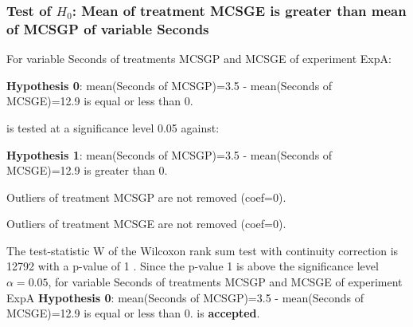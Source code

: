 \begin{frame}[t]
 \frametitle{Test of $H_{0}$: Mean of treatment MCSGE is greater than mean of MCSGP of variable Seconds }
 \scriptsize
 For variable Seconds of treatments MCSGP and MCSGE of experiment ExpA:

\vspace{1mm}
{\bf Hypothesis 0}: mean(Seconds of MCSGP)=3.5 - mean(Seconds of MCSGE)=12.9 is equal or less than 0.


 \begin{center} is tested at a significance level 0.05 against: \end{center}

{\bf Hypothesis 1}: mean(Seconds of MCSGP)=3.5 - mean(Seconds of MCSGE)=12.9 is greater than 0.
\vspace{1mm}
\vspace{1mm}

 Outliers of treatment MCSGP  are not removed (coef=0).

 Outliers of treatment MCSGE  are not removed (coef=0).
\vspace{1mm}
 
 The test-statistic W of the Wilcoxon rank sum test with continuity correction is 12792 with a p-value of 1 .
 Since the p-value 1 is above the significance level $\alpha= 0.05 $,
 for variable Seconds of treatments MCSGP and MCSGE of experiment ExpA 
 {\bf Hypothesis 0}: mean(Seconds of MCSGP)=3.5 - mean(Seconds of MCSGE)=12.9 is equal or less than 0.
is {\bf accepted}.

 \end{frame}

